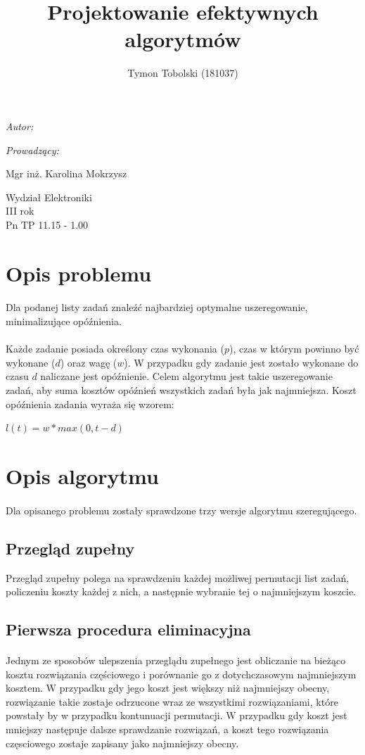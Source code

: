 \documentclass[wide,a4paper,titlepage,12pt] {article}
\title{Projektowanie efektywnych algorytmów}
\author{Tymon Tobolski (181037)}
\makeatletter
\renewcommand{\maketitle}{
\begin{titlepage}
  \begin{center}
    \vspace*{3cm}
    \LARGE \@title \par
    \vspace{2cm}
    \textit{\small Autor:}\par
    \normalsize \@author\par \normalsize
    \vspace{3cm}
    \textit{\small Prowadzący:}\par
    Mgr inż. Karolina Mokrzysz \par
    \vspace{2cm}
    Wydział Elektroniki\\ III rok\\ Pn TP 11.15 - 1.00\par
    \vspace{4cm}
    \small \@date
  \end{center}
\end{titlepage}
}
\makeatother
\begin{document}
\maketitle
  \section{Opis problemu}
  \paragraph{}
  Dla podanej listy zadań znaleźć najbardziej optymalne uszeregowanie,
  minimalizujące opóźnienia.

  \paragraph{}
  Każde zadanie posiada określony czas wykonania ($p$),
  czas w którym powinno być wykonane ($d$) oraz wagę ($w$).
  W przypadku gdy zadanie jest zostało wykonane do czasu $d$ naliczane jest opóźnienie.
  Celem algorytmu jest takie uszeregowanie zadań, aby suma kosztów opóźnień wszystkich zadań
  była jak najmniejsza. Koszt opóźnienia zadania wyraża się wzorem:

  $l(t) = w * max(0, t - d) $

  \section{Opis algorytmu}
  \paragraph{}
  Dla opisanego problemu zostały sprawdzone trzy wersje algorytmu szeregującego.

  \subsection{Przegląd zupełny}
  Przegląd zupełny polega na sprawdzeniu każdej możliwej permutacji list zadań,
  policzeniu koszty każdej z nich, a następnie wybranie tej o najmniejszym koszcie.


  \subsection{Pierwsza procedura eliminacyjna}
  \paragraph{}
  Jednym ze sposobów ulepszenia przeglądu zupełnego jest obliczanie na bieżąco
  kosztu rozwiązania częściowego i porównanie go z dotychczasowym najmniejszym
  kosztem. W przypadku gdy jego koszt jest większy niż najmniejszy obecny, rozwiązanie
  takie zostaje odrzucone wraz ze wszystkimi rozwiązaniami, które powstały by w przypadku
  kontunuacji permutacji. W przypadku gdy koszt jest mniejszy następuje dalsze sprawdzanie
  rozwiązań, a koszt tego rozwiązania częsciowego zostaje zapisany jako najmniejszy obecny.
\end{document}

